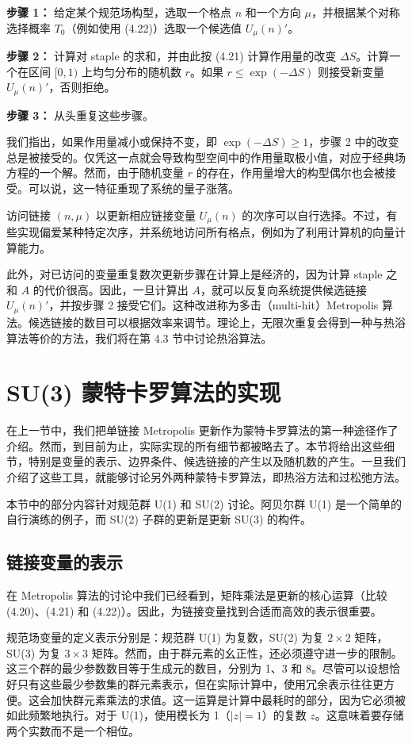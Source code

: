 \textbf{步骤 1：} 给定某个规范场构型，选取一个格点 $n$ 和一个方向 $\mu$，并根据某个对称选择概率 $T_0$（例如使用 (4.22)）选取一个候选值 $U_\mu(n)'$。

\textbf{步骤 2：} 计算对 staple 的求和，并由此按 (4.21) 计算作用量的改变 $\Delta S$。计算一个在区间 $[0,1)$ 上均匀分布的随机数 $r$。如果 $r \leq \exp(-\Delta S)$ 则接受新变量 $U_\mu(n)'$，否则拒绝。

\textbf{步骤 3：} 从头重复这些步骤。

我们指出，如果作用量减小或保持不变，即 $\exp(-\Delta S) \geq 1$，步骤 2 中的改变总是被接受的。仅凭这一点就会导致构型空间中的作用量取极小值，对应于经典场方程的一个解。然而，由于随机变量 $r$ 的存在，作用量增大的构型偶尔也会被接受。可以说，这一特征重现了系统的量子涨落。

访问链接 $(n, \mu)$ 以更新相应链接变量 $U_\mu(n)$ 的次序可以自行选择。不过，有些实现偏爱某种特定次序，并系统地访问所有格点，例如为了利用计算机的向量计算能力。

此外，对已访问的变量重复数次更新步骤在计算上是经济的，因为计算 staple 之和 $A$ 的代价很高。因此，一旦计算出 $A$，就可以反复向系统提供候选链接 $U_\mu(n)'$，并按步骤 2 接受它们。这种改进称为多击（multi-hit）Metropolis 算法。候选链接的数目可以根据效率来调节。理论上，无限次重复会得到一种与热浴算法等价的方法，我们将在第 4.3 节中讨论热浴算法。

\section{SU(3) 蒙特卡罗算法的实现}

在上一节中，我们把单链接 Metropolis 更新作为蒙特卡罗算法的第一种途径作了介绍。然而，到目前为止，实际实现的所有细节都被略去了。本节将给出这些细节，特别是变量的表示、边界条件、候选链接的产生以及随机数的产生。一旦我们介绍了这些工具，就能够讨论另外两种蒙特卡罗算法，即热浴方法和过松弛方法。

本节中的部分内容针对规范群 U(1) 和 SU(2) 讨论。阿贝尔群 U(1) 是一个简单的自行演练的例子，而 SU(2) 子群的更新是更新 SU(3) 的构件。

\subsection{链接变量的表示}

在 Metropolis 算法的讨论中我们已经看到，矩阵乘法是更新的核心运算（比较 (4.20)、(4.21) 和 (4.22)）。因此，为链接变量找到合适而高效的表示很重要。

规范场变量的定义表示分别是：规范群 U(1) 为复数，SU(2) 为复 $2\times2$ 矩阵，SU(3) 为复 $3\times3$ 矩阵。然而，由于群元素的幺正性，还必须遵守进一步的限制。这三个群的最少参数数目等于生成元的数目，分别为 1、3 和 8。尽管可以设想恰好只有这些最少参数集的群元素表示，但在实际计算中，使用冗余表示往往更方便。这会加快群元素乘法的求值。这一运算是计算中最耗时的部分，因为它必须被如此频繁地执行。对于 U(1)，使用模长为 1（$|z| = 1$）的复数 $z$。这意味着要存储两个实数而不是一个相位。

